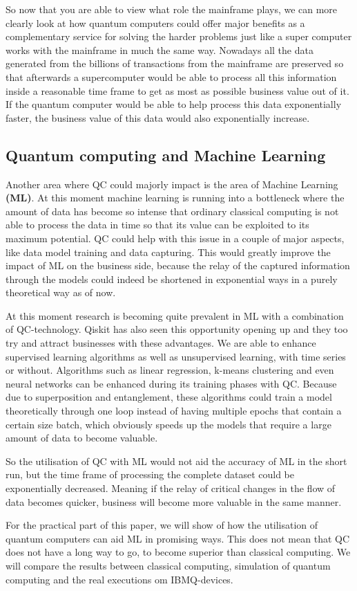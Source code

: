 So now that you are able to view what role the mainframe plays, we can more clearly look at how quantum computers could offer major benefits as a complementary service for solving the harder problems just like a super computer works with the mainframe in much the same way. Nowadays all the data generated from the billions of transactions from the mainframe are preserved so that afterwards a supercomputer would be able to process all this information inside a reasonable time frame to get as most as possible business value out of it. If the quantum computer would be able to help process this data exponentially faster, the business value of this data would also exponentially increase.



\subsection{Quantum computing and Machine Learning}

Another area where QC could majorly impact is the area of Machine Learning \textbf{(ML)}. At this moment machine learning is running into a bottleneck where the amount of data has become so intense that ordinary classical computing is not able to process the data in time so that its value can be exploited to its maximum potential. QC could help with this issue in a couple of major aspects, like data model training and data capturing. This would greatly improve the impact of ML on the business side, because the relay of the captured information through the models could indeed be shortened in exponential ways in a purely theoretical way as of now. \autocite{Biamonte2017}

At this moment research is becoming quite prevalent in ML with a combination of QC-technology. Qiskit has also seen this opportunity opening up and they too try and attract businesses with these advantages. We are able to enhance supervised learning algorithms as well as unsupervised learning, with time series or without. Algorithms such as linear regression, k-means clustering and even neural networks can be enhanced during its training phases with QC. Because due to superposition and entanglement, these algorithms could train a model theoretically through one loop instead of having multiple epochs that contain a certain size batch, which obviously speeds up the models that require a large amount of data to become valuable.

So the utilisation of QC with ML would not aid the accuracy of ML in the short run, but the time frame of processing the complete dataset could be exponentially decreased. Meaning if the relay of critical changes in the flow of data becomes quicker, business will become more valuable in the same manner.

For the practical part of this paper, we will show of how the utilisation of quantum computers can aid ML in promising ways. This does not mean that QC does not have a long way to go, to become superior than classical computing. We will compare the results between classical computing, simulation of quantum computing and the real executions om IBMQ-devices.



